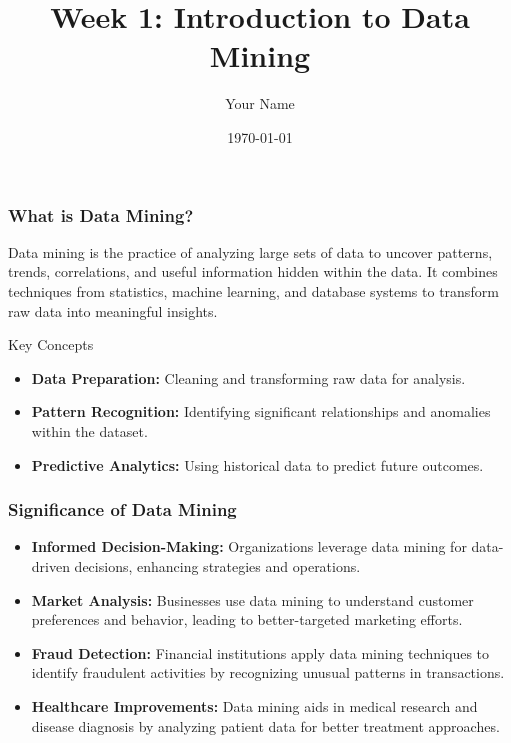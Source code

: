 \documentclass{beamer}
\title{Week 1: Introduction to Data Mining}
\author{Your Name}
\institute{Your Institution}
\date{\today}
\begin{document}
\frame{\titlepage}

\begin{frame}[fragile]
    \titlepage
\end{frame}

\begin{frame}[fragile]
    \frametitle{What is Data Mining?}
    Data mining is the practice of analyzing large sets of data to uncover patterns, trends, correlations, and useful information hidden within the data. It combines techniques from statistics, machine learning, and database systems to transform raw data into meaningful insights.

    \begin{block}{Key Concepts}
        \begin{itemize}
            \item \textbf{Data Preparation:} Cleaning and transforming raw data for analysis.
            \item \textbf{Pattern Recognition:} Identifying significant relationships and anomalies within the dataset.
            \item \textbf{Predictive Analytics:} Using historical data to predict future outcomes.
        \end{itemize}
    \end{block}
\end{frame}

\begin{frame}[fragile]
    \frametitle{Significance of Data Mining}
    \begin{itemize}
        \item \textbf{Informed Decision-Making:} Organizations leverage data mining for data-driven decisions, enhancing strategies and operations.
        \item \textbf{Market Analysis:} Businesses use data mining to understand customer preferences and behavior, leading to better-targeted marketing efforts.
        \item \textbf{Fraud Detection:} Financial institutions apply data mining techniques to identify fraudulent activities by recognizing unusual patterns in transactions.
        \item \textbf{Healthcare Improvements:} Data mining aids in medical research and disease diagnosis by analyzing patient data for better treatment approaches.
    \end{itemize}
\end{frame}
\end{document}

